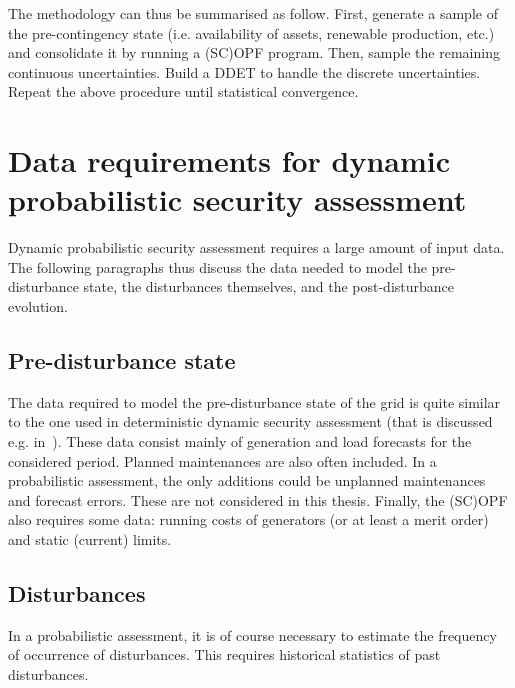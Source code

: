 The methodology can thus be summarised as follow. First, generate a sample of the pre-contingency state (i.e. availability of assets, renewable production, etc.) and consolidate it by running a (SC)OPF program. Then, sample the remaining continuous uncertainties. Build a DDET to handle the discrete uncertainties. Repeat the above procedure until statistical convergence.



\section{Data requirements for dynamic probabilistic security assessment}
\label{sec:DataRequirementsForDSA}

Dynamic probabilistic security assessment requires a large amount of input data. The following paragraphs thus discuss the data needed to model the pre-disturbance state, the disturbances themselves, and the post-disturbance evolution.

\subsection{Pre-disturbance state}

The data required to model the pre-disturbance state of the grid is quite similar to the one used in deterministic dynamic security assessment (that is discussed e.g. in~\cite{EurostagHPC}). These data consist mainly of generation and load forecasts for the considered period. Planned maintenances are also often included. In a probabilistic assessment, the only additions could be unplanned maintenances and forecast errors. These are not considered in this thesis. Finally, the (SC)OPF also requires some data: running costs of generators (or at least a merit order) and static (current) limits.

\subsection{Disturbances}

In a probabilistic assessment, it is of course necessary to estimate the frequency of occurrence of disturbances. This requires historical statistics of past disturbances.

